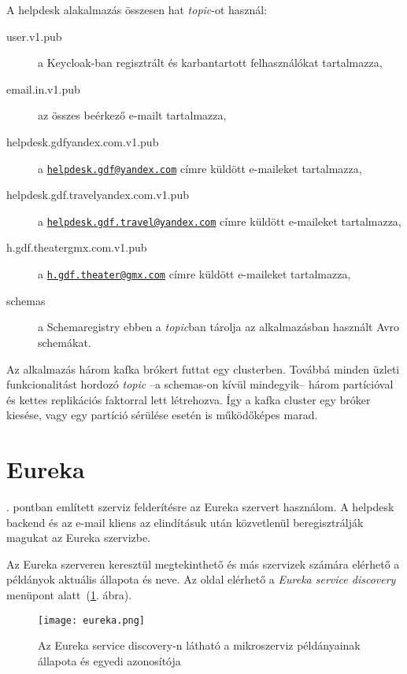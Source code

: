 A helpdesk alakalmazás összesen hat \textit{topic}-ot használ:
\begin{description}
	\item[user.v1.pub] a Keycloak-ban regisztrált és karbantartott felhasználókat tartalmazza,
	
	\item[email.in.v1.pub] az összes beérkező  e-mailt tartalmazza,
	
	\item[helpdesk.gdf\textunderscore yandex.com.v1.pub] a  \href{mailto:helpdesk.gdf@yandex.com}{\nolinkurl{helpdesk.gdf@yandex.com}} címre küldött e-maileket tartalmazza,
	
	\item[helpdesk.gdf.travel\textunderscore yandex.com.v1.pub] a \href{mailto:helpdesk.gdf.travel@yandex.com}{\nolinkurl{helpdesk.gdf.travel@yandex.com}} címre küldött e-maileket tartalmazza,
	
	
	\item[h.gdf.theater\textunderscore gmx.com.v1.pub] a \href{mailto:h.gdf.theater@gmx.com}{\nolinkurl{h.gdf.theater@gmx.com}} címre küldött e-maileket tartalmazza,
	
	\item[\textunderscore schemas] a Schemaregistry ebben a \textit{topic}ban tárolja az alkalmazásban használt Avro schemákat.
\end{description}


Az alkalmazás három kafka brókert futtat egy clusterben. Továbbá minden üzleti funkcionalitást hordozó \textit{topic} --a \textunderscore schemas-on kívül mindegyik-- három partícióval és kettes replikációs faktorral lett létrehozva.
Így a kafka cluster egy bróker kiesése, vagy egy partíció sérülése esetén is működőképes marad.


\section{Eureka}
. pontban említett szerviz felderítésre az Eureka szervert használom. A helpdesk backend és az e-mail kliens az elindításuk után közvetlenül beregisztrálják magukat az Eureka szervizbe.

Az Eureka szerveren keresztül megtekinthető és más szervizek számára elérhető a példányok aktuális állapota és neve. Az oldal elérhető a \textit{Eureka service discovery} menüpont alatt~(\ref{fig:eureka}. ábra).


\begin{figure}[hbt] 
	\centering
	\texttt{[image: eureka.png]}
	\caption[Az Eureka service discovery felülete]{Az Eureka service discovery-n látható a mikroszerviz példányainak állapota és egyedi azonosítója}
	\label{fig:eureka}
\end{figure}


